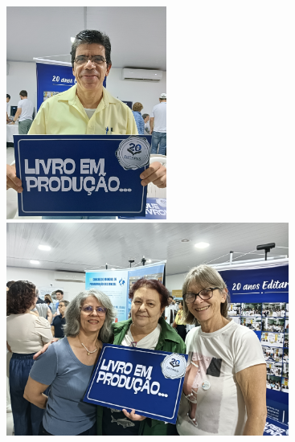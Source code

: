 \documentclass{gescons}
\begin{document}
  \begin{center}
    \includegraphics[height=7cm]{articles/resumo/fotos/materia2/IMG20241208144653.jpg}
    \hspace{2.5mm}
    \includegraphics[height=7cm]{articles/resumo/fotos/materia2/IMG20241208155101.jpg}
  \end{center}





        
\end{document}
